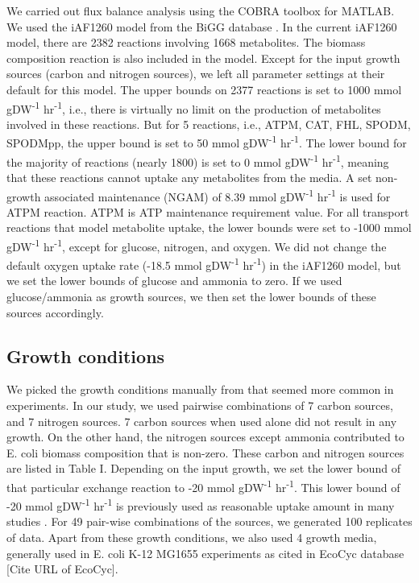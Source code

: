 \documentclass[12pt]{article}
\begin{document}
We carried out flux balance analysis using the COBRA toolbox \cite{Schellenbergeretal2011} for MATLAB. 
We used the iAF1260 model from the BiGG database \cite{Schellenbergeretal2010}. In the current iAF1260 model, there are 2382 reactions involving 1668 metabolites. The biomass composition reaction is also included in the model. Except for the input growth sources (carbon and nitrogen sources), we left all parameter settings at their default for this model. The upper bounds on 2377 reactions is set to 1000  mmol gDW\textsuperscript{-1} hr\textsuperscript{-1}, i.e., there is virtually no limit on the production of metabolites involved in these reactions. But for 5 reactions, i.e., ATPM, CAT, FHL, SPODM, SPODMpp, the upper bound is set to 50 mmol gDW\textsuperscript{-1} hr\textsuperscript{-1}. The lower bound for the majority of reactions (nearly 1800) is set to 0 mmol gDW\textsuperscript{-1} hr\textsuperscript{-1}, meaning that these reactions cannot uptake any metabolites from the media. A set non-growth associated maintenance (NGAM) of 8.39  mmol gDW\textsuperscript{-1} hr\textsuperscript{-1} is used for ATPM reaction. ATPM is ATP maintenance requirement value. For all transport reactions that model metabolite uptake, the lower bounds were set to -1000 mmol gDW\textsuperscript{-1} hr\textsuperscript{-1}, except for glucose, nitrogen, and oxygen. We did not change the default oxygen uptake rate (-18.5 mmol gDW\textsuperscript{-1} hr\textsuperscript{-1}) in the iAF1260 model, but we set the lower bounds of glucose and ammonia to zero. If we used glucose/ammonia as growth sources, we then set the lower bounds of these sources accordingly.

\subsection*{Growth conditions} 
We picked the growth conditions manually from \cite{Feistetal2007} that seemed more common in experiments. In our study, we used pairwise combinations of 7 carbon sources, and 7 nitrogen sources. 7 carbon sources when used alone did not result in any growth. On the other hand, the nitrogen sources except ammonia contributed to E. coli biomass composition that is non-zero. These carbon and nitrogen sources are listed in Table I. Depending on the input growth, we set the lower bound of that particular exchange reaction to -20 mmol gDW\textsuperscript{-1} hr\textsuperscript{-1}. This lower bound of -20 mmol gDW\textsuperscript{-1} hr\textsuperscript{-1} is previously used as reasonable uptake amount in many studies \cite{Feistetal2007}. For 49 pair-wise combinations of the sources, we generated 100 replicates of data. Apart from these growth conditions, we also used 4 growth media, generally used in E. coli K-12 MG1655 experiments as cited in EcoCyc database [Cite URL of EcoCyc].
\end{document}

